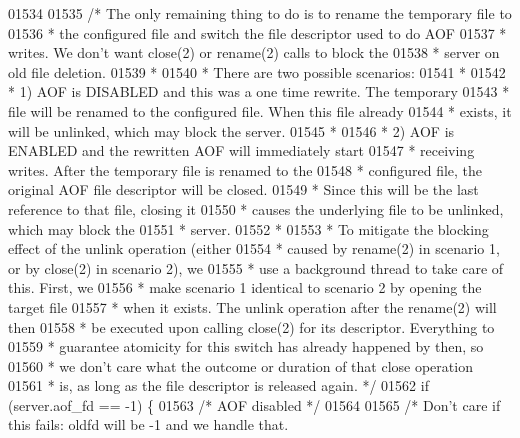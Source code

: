 \begin{DoxyCode}
{{{{{{{{{{{{{{{{{{{{{{{{{{{{{{{{{01534 
01535         \textcolor{comment}{/* The only remaining thing to do is to rename the temporary file to}
01536 \textcolor{comment}{         * the configured file and switch the file descriptor used to do AOF}
01537 \textcolor{comment}{         * writes. We don't want close(2) or rename(2) calls to block the}
01538 \textcolor{comment}{         * server on old file deletion.}
01539 \textcolor{comment}{         *}
01540 \textcolor{comment}{         * There are two possible scenarios:}
01541 \textcolor{comment}{         *}
01542 \textcolor{comment}{         * 1) AOF is DISABLED and this was a one time rewrite. The temporary}
01543 \textcolor{comment}{         * file will be renamed to the configured file. When this file already}
01544 \textcolor{comment}{         * exists, it will be unlinked, which may block the server.}
01545 \textcolor{comment}{         *}
01546 \textcolor{comment}{         * 2) AOF is ENABLED and the rewritten AOF will immediately start}
01547 \textcolor{comment}{         * receiving writes. After the temporary file is renamed to the}
01548 \textcolor{comment}{         * configured file, the original AOF file descriptor will be closed.}
01549 \textcolor{comment}{         * Since this will be the last reference to that file, closing it}
01550 \textcolor{comment}{         * causes the underlying file to be unlinked, which may block the}
01551 \textcolor{comment}{         * server.}
01552 \textcolor{comment}{         *}
01553 \textcolor{comment}{         * To mitigate the blocking effect of the unlink operation (either}
01554 \textcolor{comment}{         * caused by rename(2) in scenario 1, or by close(2) in scenario 2), we}
01555 \textcolor{comment}{         * use a background thread to take care of this. First, we}
01556 \textcolor{comment}{         * make scenario 1 identical to scenario 2 by opening the target file}
01557 \textcolor{comment}{         * when it exists. The unlink operation after the rename(2) will then}
01558 \textcolor{comment}{         * be executed upon calling close(2) for its descriptor. Everything to}
01559 \textcolor{comment}{         * guarantee atomicity for this switch has already happened by then, so}
01560 \textcolor{comment}{         * we don't care what the outcome or duration of that close operation}
01561 \textcolor{comment}{         * is, as long as the file descriptor is released again. */}
01562         \textcolor{keywordflow}{if} (server.aof\_fd == -1) \{
01563             \textcolor{comment}{/* AOF disabled */}
01564 
01565              \textcolor{comment}{/* Don't care if this fails: oldfd will be -1 and we handle that.}
}}}}}}}}}}}}}}}}}}}}}}}}}}}}}}}}}
\end{DoxyCode}

